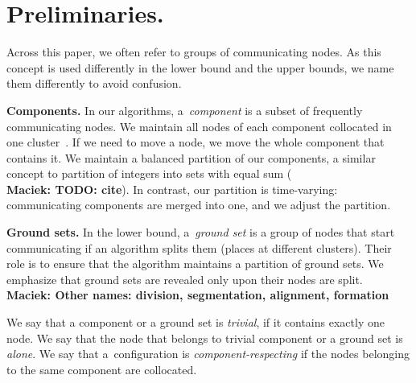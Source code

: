 \documentclass[manuscript,screen=true, review, anonymous]{acmart}
\newcommand\maciek[1]{\color{brown}\textbf{\\ Maciek: #1}\color{black}}
\begin{document}

\section{Preliminaries.}
\label{sec:prelim}

Across this paper, we often refer to groups of communicating nodes.
As this concept is used differently in the lower bound and the upper bounds, we name them differently to avoid confusion.

\noindent
\textbf{Components.}
In our algorithms, a~\emph{component} is a subset of frequently communicating nodes.
We maintain all nodes of each component collocated in one cluster~\cite{repartition-disc}.
If we need to move a node, we move the whole component that contains it.
We maintain a balanced partition of our components, a similar concept to partition of integers into sets with equal sum (\maciek{TODO: cite}).
In contrast, our partition is time-varying: communicating components are merged into one, and we adjust the partition.

\noindent
\textbf{Ground sets.}
In the lower bound, a~\emph{ground set} is a group of nodes that start communicating if an algorithm splits them (places at different clusters).
Their role is to ensure that the algorithm maintains a partition of ground sets.
We emphasize that ground sets are revealed only upon their nodes are split.
\maciek{Other names: division, segmentation, alignment, formation}


We say that a component or a ground set is \emph{trivial}, if it contains exactly one node.
We say that the node that belongs to trivial component or a ground set is \emph{alone}.
We say that a~configuration is \emph{component-respecting}
if the nodes belonging to the same component are collocated.
\end{document}
